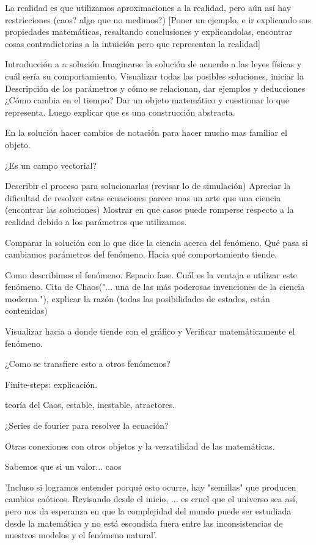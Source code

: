 \documentclass{article}
\begin{document}
La realidad es que utilizamos aproximaciones a la realidad, pero aún así hay restricciones (caos? algo que no medimos?) [Poner un ejemplo, e ir explicando sus propiedades matemáticas, resaltando conclusiones y explicandolas, encontrar cosas contradictorias a la intuición pero que representan la realidad]

Introducción a a solución
Imaginarse la solución de acuerdo a las leyes físicas y cuál sería su comportamiento. Visualizar todas las posibles soluciones, iniciar la Descripción de los parámetros y cómo se relacionan, dar ejemplos y deducciones ¿Cómo cambia en el tiempo? Dar un objeto matemático y cuestionar lo que representa. Luego explicar que es una construcción abstracta.

En la solución hacer cambios de notación para hacer mucho mas familiar el objeto.

¿Es un campo vectorial?

Describir el proceso para solucionarlas (revisar lo de simulación)
Apreciar la dificultad de resolver estas ecuaciones
parece mas un arte que una ciencia (encontrar las soluciones)
Mostrar en que casos puede romperse respecto a la realidad debido a los parámetros que utilizamos.

Comparar la solución con lo que dice la ciencia acerca del fenómeno. Qué pasa si cambiamos parámetros del fenómeno. Hacia qué comportamiento tiende.

Como describimos el fenómeno. Espacio fase. Cuál es la ventaja e utilizar este fenómeno.  Cita de Chaos("... una de las más poderosas invenciones de la ciencia moderna."), explicar la razón (todas las posibilidades de estados, están contenidas)

Visualizar hacia a donde tiende con el gráfico y Verificar matemáticamente el fenómeno.

¿Como se transfiere esto a otros fenómenos?

Finite-steps: explicación.

teoría del Caos, estable, inestable, atractores.

¿Series de fourier para resolver la ecuación?

Otras conexiones con otros objetos y la versatilidad de las matemáticas.

Sabemos que si un valor... caos

'Incluso si logramos entender porqué esto ocurre, hay "semillas" que producen cambios caóticos. Revisando desde el inicio, ... es cruel que el universo sea así, pero nos da esperanza en que la complejidad del mundo puede ser estudiada desde la matemática y no está escondida fuera entre las inconsistencias de nuestros modelos y el fenómeno natural'. 
\nocite{*}

\end{document}
